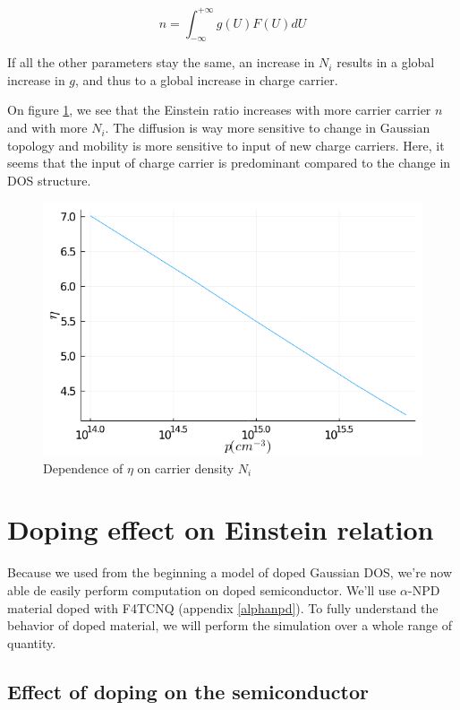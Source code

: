 \begin{equation}
    n = \int_{-\infty}^{+\infty}g(U)F(U)d U
    \label{eq:3_15}
\end{equation}

If all the other parameters stay the same, an increase in $N_i$ results in a global increase in $g$, and thus to a global increase in charge carrier.

On figure \ref{fig:3_26}, we see that the Einstein ratio increases with more carrier carrier $n$ and with more $N_i$. The diffusion is way more sensitive to change in Gaussian topology and mobility is more sensitive to input of new charge carriers. Here, it seems that the input of charge carrier is predominant compared to the change in DOS structure.

\begin{figure}[!h]
    \centering
    \includegraphics*[width=.5\paperwidth]{figures/3_elec/undoped_charge.png}
    \caption{Dependence of $\eta$ on carrier density $N_i$ \label{fig:3_26}}
\end{figure}

\section{Doping effect on Einstein relation}

Because we used from the beginning a model of doped Gaussian DOS, we're now able de easily perform computation on doped semiconductor. We'll use $\alpha$-NPD material doped with F4TCNQ (appendix \ref{alphanpd}). To fully understand the behavior of doped material, we will perform the simulation over a whole range of quantity.

\subsection{Effect of doping on the semiconductor}

